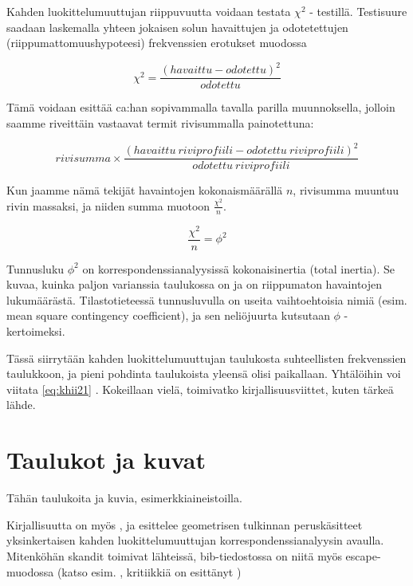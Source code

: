 \documentclass[
  finnish,
]{book}
\begin{document}
Kahden luokittelumuuttujan riippuvuutta voidaan testata \(\chi^{2}\) - testillä. Testisuure saadaan laskemalla yhteen jokaisen solun havaittujen ja odotetettujen (riippumattomuushypoteesi) frekvenssien erotukset muodossa

\begin{equation}
  \chi^{2} = \frac{(havaittu - odotettu)^2} {odotettu}
  \label{eq:khii21}
\end{equation}

Tämä voidaan esittää ca:han sopivammalla tavalla parilla muunnoksella, jolloin saamme riveittäin vastaavat termit rivisummalla painotettuna:

\begin{equation}
  rivisumma \times \frac{(havaittu \: riviprofiili - odotettu \: riviprofiili)^2} {odotettu \: riviprofiili}
  \label{eq:khii22}
\end{equation}

Kun jaamme nämä tekijät havaintojen kokonaismäärällä \(n\), rivisumma muuntuu rivin massaksi, ja niiden summa muotoon \(\frac{\chi^{2}}{n}\).

\begin{equation}
 \frac{\chi^{2}}{n} = \phi^{2}
 \label{eq:inert1}
\end{equation}

Tunnusluku \(\phi^{2}\) on korrespondenssianalyysissä kokonaisinertia (total inertia). Se kuvaa, kuinka paljon varianssia taulukossa on ja on riippumaton havaintojen lukumäärästä. Tilastotieteessä tunnusluvulla on useita vaihtoehtoisia nimiä (esim. mean square contingency coefficient), ja sen neliöjuurta kutsutaan \(\phi\) - kertoimeksi.

Tässä siirrytään kahden luokittelumuuttujan taulukosta suhteellisten frekvenssien taulukkoon, ja pieni pohdinta taulukoista yleensä olisi paikallaan. Yhtälöihin voi viitata \eqref{eq:khii21} . Kokeillaan vielä, toimivatko kirjallisuusviittet, kuten tärkeä lähde\citep{RefWorks:55}.

\hypertarget{taulukot-ja-kuvat}{%
\chapter{Taulukot ja kuvat}\label{taulukot-ja-kuvat}}

Tähän taulukoita ja kuvia, esimerkkiaineistoilla.

Kirjallisuutta on myös \citep{RefWorks:68}, ja \citep{RefWorks:57} esittelee geometrisen tulkinnan peruskäsitteet yksinkertaisen kahden luokittelumuuttujan korrespondenssianalyysin avaulla. Mitenköhän skandit toimivat lähteissä, bib-tiedostossa on niitä myös escape-muodossa (katso esim. \citep{RefWorks:100}, kritiikkiä on esittänyt \citep{RefWorks:110})
\end{document}

